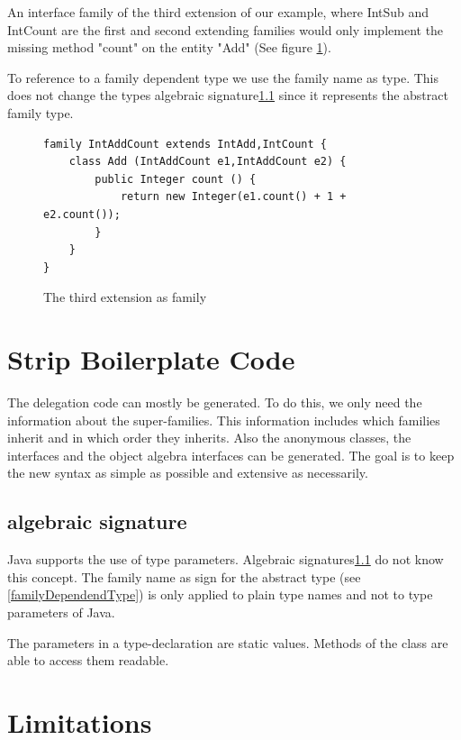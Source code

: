 \documentclass{report}
\begin{document}
An interface family of the third extension of our example, where IntSub and IntCount are the first and second extending families would only implement the missing method "count" on the entity "Add" (See figure \ref{thirdExtensionFamily}).

\label{familyDependendType}
To reference to a family dependent type we use the family name as type. This does not change the types algebraic signature\ref{albegraicSignature} since it represents the abstract family type.

\begin{figure}[h]
\begin{lstlisting}[language=exprExt]
family IntAddCount extends IntAdd,IntCount {
    class Add (IntAddCount e1,IntAddCount e2) {
        public Integer count () {
            return new Integer(e1.count() + 1 + e2.count());
        }
    }
}
\end{lstlisting}
\caption{The third extension as family}
\label{thirdExtensionFamily}
\end{figure}

\section{Strip Boilerplate Code}

The delegation code can mostly be generated. To do this, we only need the information about the super-families. This information includes which families inherit and in which order they inherits. Also the anonymous classes, the interfaces and the object algebra interfaces can be generated. The goal is to keep the new syntax as simple as possible and extensive as necessarily.

\subsection{algebraic signature}
\label{albegraicSignature}


Java supports the use of type parameters. Algebraic signatures\ref{albegraicSignature} do not know this concept. The family name as sign for the abstract type (see \ref{familyDependendType}) is only applied to plain type names and not to type parameters of Java.

The parameters in a type-declaration are static values. Methods of the class are able to access them readable.


\section{Limitations}
\label{syntaxExtensionLimitations}
\end{document}

